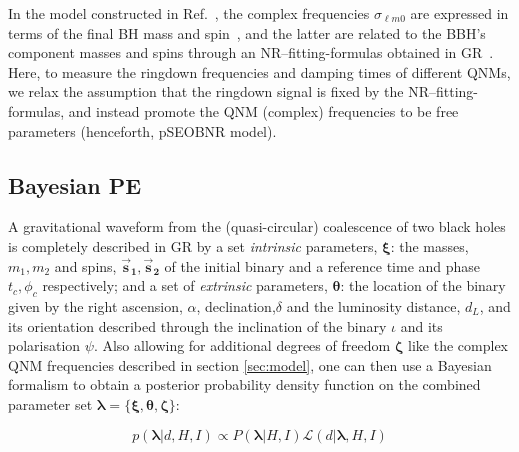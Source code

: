 \documentclass[twocolumn,prd,superscriptaddress,amsfonts,amssymb,amsmath,preprintnumbers]{revtex4-1}
\newcommand{\blambda}{\bm{\lambda}}
\newcommand{\btheta}{\bm{\theta}}
\newcommand{\bxi}{\bm{\xi}}
\newcommand{\bzeta}{\bm{\zeta}}
\newcommand{\bs}[1]{\bm{\vec{s}_{#1}}}
\begin{document}
 
  In the model constructed in Ref.~\cite{Cotesta:2018fcv}, the complex frequencies $\sigma_{\ell m 0}$  are expressed in terms of the final BH mass and spin~\cite{Berti:2005ys,Berti:2009kk}, and the latter are related to the BBH's component masses and spins through an
  NR--fitting-formulas obtained in GR~\cite{Taracchini:2013rva,Hofmann:2016yih}. 
  Here, to measure the ringdown frequencies and damping times of
  different QNMs, we relax the assumption that the ringdown signal is
  fixed by the NR--fitting-formulas, and
  instead promote the QNM (complex) frequencies to be free
  parameters (henceforth, pSEOBNR model). 


\subsection{Bayesian PE}\label{sec:method}

A gravitational waveform from the (quasi-circular) coalescence of two black holes is completely described in GR by a set \textit{intrinsic} parameters, $\bxi$: the masses, $m_1, m_2$ and spins, $\bs1, \bs2$ of the initial binary and a reference time and phase $t_c, \phi_c$ respectively; and a set of \textit{extrinsic} parameters, $\btheta$: the location of the binary given by the right ascension, $\alpha$, declination,$\delta$ and the luminosity distance, $d_L$, and its orientation described through the inclination of the binary $\iota$ and its polarisation $\psi$. Also allowing for additional degrees of freedom $\bzeta$ like the complex QNM frequencies described in section \ref{sec:model}, one can then use a Bayesian formalism to obtain a posterior probability density function on the combined parameter set $\blambda = \{\bxi, \btheta, \bzeta\}$:

\begin{equation}
p(\blambda | d, H, I) \propto P(\blambda | H,I) \mathcal{L}(d | \blambda, H, I)
\end{equation}
\end{document}
